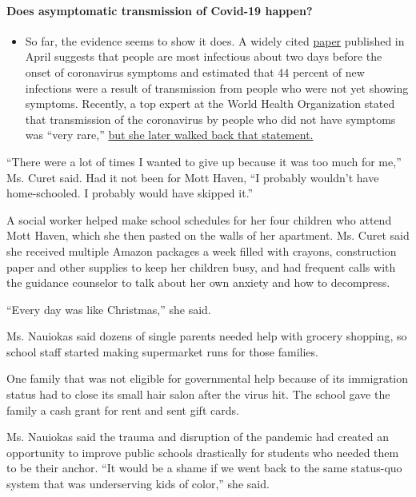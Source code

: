 \begin{itemize}
{  \paragraph{Does asymptomatic transmission of Covid-19
  happen?}\label{does-asymptomatic-transmission-of-covid-19-happen}}

  \begin{itemize}
  \tightlist
  \item
    So far, the evidence seems to show it does. A widely cited
    \href{https://www.nature.com/articles/s41591-020-0869-5}{paper}
    published in April suggests that people are most infectious about
    two days before the onset of coronavirus symptoms and estimated that
    44 percent of new infections were a result of transmission from
    people who were not yet showing symptoms. Recently, a top expert at
    the World Health Organization stated that transmission of the
    coronavirus by people who did not have symptoms was ``very rare,''
    \href{https://www.nytimes3xbfgragh.onion/2020/06/09/world/coronavirus-updates.html?action=click\&pgtype=Article\&state=default\&region=MAIN_CONTENT_3\&context=storylines_faq\#link-1f302e21}{but
    she later walked back that statement.}
  \end{itemize}
\end{itemize}

``There were a lot of times I wanted to give up because it was too much
for me,'' Ms. Curet said. Had it not been for Mott Haven, ``I probably
wouldn't have home-schooled. I probably would have skipped it.''

A social worker helped make school schedules for her four children who
attend Mott Haven, which she then pasted on the walls of her apartment.
Ms. Curet said she received multiple Amazon packages a week filled with
crayons, construction paper and other supplies to keep her children
busy, and had frequent calls with the guidance counselor to talk about
her own anxiety and how to decompress.

``Every day was like Christmas,'' she said.

Ms. Nauiokas said dozens of single parents needed help with grocery
shopping, so school staff started making supermarket runs for those
families.

One family that was not eligible for governmental help because of its
immigration status had to close its small hair salon after the virus
hit. The school gave the family a cash grant for rent and sent gift
cards.

Ms. Nauiokas said the trauma and disruption of the pandemic had created
an opportunity to improve public schools drastically for students who
needed them to be their anchor. ``It would be a shame if we went back to
the same status-quo system that was underserving kids of color,'' she
said.

